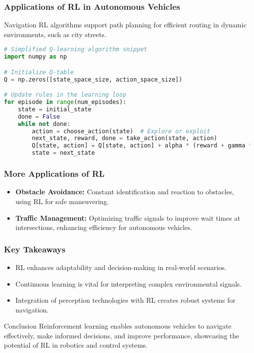 \documentclass[aspectratio=169]{beamer}
\begin{document}
\begin{frame}[fragile]
    \frametitle{Applications of RL in Autonomous Vehicles}
    \begin{block}{Navigation}
        RL algorithms support path planning for efficient routing in dynamic environments, such as city streets.
        \begin{lstlisting}[language=Python]
# Simplified Q-learning algorithm snippet
import numpy as np

# Initialize Q-table
Q = np.zeros([state_space_size, action_space_size])

# Update rules in the learning loop
for episode in range(num_episodes):
    state = initial_state
    done = False
    while not done:
        action = choose_action(state)  # Explore or exploit
        next_state, reward, done = take_action(state, action)
        Q[state, action] = Q[state, action] + alpha * (reward + gamma * np.max(Q[next_state]) - Q[state, action])
        state = next_state
        \end{lstlisting}
    \end{block}
\end{frame}

\begin{frame}
    \frametitle{More Applications of RL}
    \begin{itemize}
        \item \textbf{Obstacle Avoidance:} 
        Constant identification and reaction to obstacles, using RL for safe maneuvering.
        
        \item \textbf{Traffic Management:} 
        Optimizing traffic signals to improve wait times at intersections, enhancing efficiency for autonomous vehicles.
    \end{itemize}
\end{frame}

\begin{frame}
    \frametitle{Key Takeaways}
    \begin{itemize}
        \item RL enhances adaptability and decision-making in real-world scenarios.
        \item Continuous learning is vital for interpreting complex environmental signals.
        \item Integration of perception technologies with RL creates robust systems for navigation.
    \end{itemize}

    \begin{block}{Conclusion}
        Reinforcement learning enables autonomous vehicles to navigate effectively, make informed decisions, and improve performance, showcasing the potential of RL in robotics and control systems.
    \end{block}
\end{frame}
\end{document}

